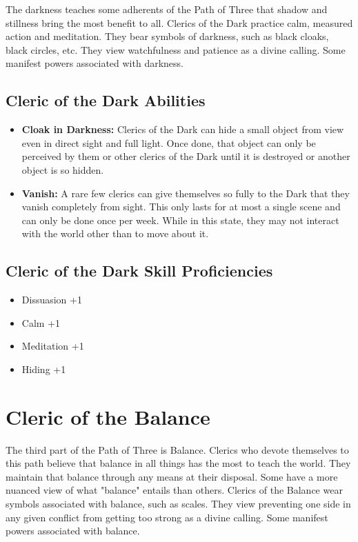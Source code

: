 \begin{multicols}{2}
The darkness teaches some adherents of the Path of Three that shadow and stillness
bring the most benefit to all. Clerics of the Dark practice calm, measured
action and meditation. They bear symbols of darkness, such as black cloaks,
black circles, etc. They view watchfulness and patience as a divine calling.
Some manifest powers associated with darkness.

\subsection{Cleric of the Dark Abilities}

\begin{itemize}
    \item \textbf{Cloak in Darkness:} Clerics of the Dark can hide a small object
    from view even in direct sight and full light. Once done, that object can only
    be perceived by them or other clerics of the Dark until it is destroyed or
    another object is so hidden.
    \item \textbf{Vanish:} A rare few clerics can give themselves so fully to the
    Dark that they vanish completely from sight. This only lasts for at most a single
    scene and can only be done once per week. While in this state, they may not
    interact with the world other than to move about it.
\end{itemize}

\subsection{Cleric of the Dark Skill Proficiencies}

\begin{itemize}
    \item Dissuasion +1
    \item Calm +1
    \item Meditation +1
    \item Hiding +1
\end{itemize}

\section{Cleric of the Balance}

The third part of the Path of Three is Balance. Clerics who devote themselves to
this path believe that balance in all things has the most to teach the world. 
They maintain that balance through any means at their disposal. Some have a more
nuanced view of what "balance" entails than others. Clerics of the Balance wear
symbols associated with balance, such as scales. They view preventing one side
in any given conflict from getting too strong as a divine calling. Some manifest
powers associated with balance.


\end{multicols}
